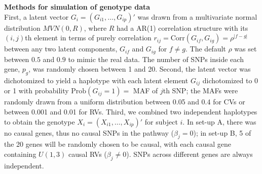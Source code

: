 \documentclass[12pt]{article}
\begin{document}

\textbf{Methods for simulation of genotype data}\\
First, a latent vector $G_i = (G_{i1}, \ldots, G_{ip})'$ was drawn from a {multivariate normal distribution} $MVN(0,R)$, where $R$ had a AR(1) correlation structure with its $(i,j)$th element in terms of purely correlation $r_{ij} =\textrm{Corr} (G_{if}, G_{ig}) = \rho ^ { |f - g| }$ between any two latent components, $G_{if}$ and $G_{ig}$ for $f \neq g$. The default $\rho$ was set between $0.5$ and $0.9$ to mimic the real data. The number of SNPs inside each gene, $p_g$, was randomly chosen between 1 and 20. Second, the latent vector was dichotomized to yield a haplotype with each latent element $G_{ij}$ dichotomized to 0 or 1 with probability $\textrm{Prob} (G_{ij} = 1) = $ MAF of $j$th SNP; the MAFs were randomly drawn from a uniform distribution between 0.05 and 0.4 for CVs or between 0.001 and 0.01 for RVs. Third, we combined two independent haplotypes to obtain the genotype $X_i = (X_{i1}, \ldots, X_{ip})' $ for subject $i$. In set-up A, there was no causal genes, thus no causal SNPs in the pathway ($\beta_j = 0$); in set-up B, 5 of the 20 genes will be randomly chosen to be causal, with each causal gene containing $U(1,3)$ causal RVs ($\beta_j \neq 0$). SNPs across different genes are always independent.
\end{document}
